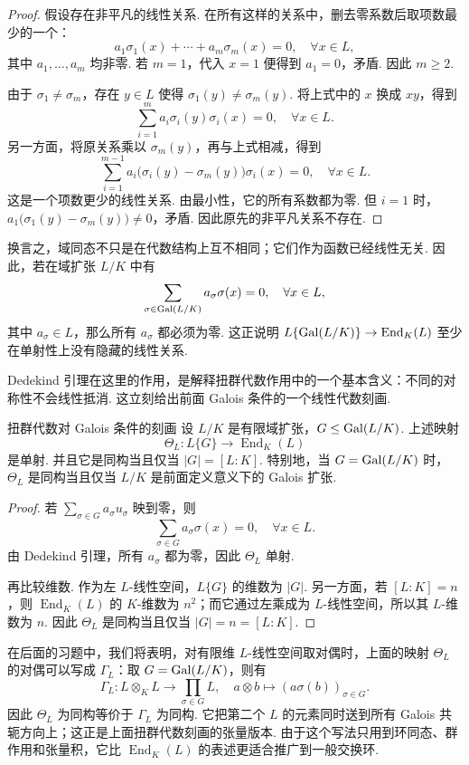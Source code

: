 \begin{proof}
    假设存在非平凡的线性关系. 在所有这样的关系中，删去零系数后取项数最少的一个：
    \[
        a_1\sigma_1(x)+\cdots+a_m\sigma_m(x)=0,\quad \forall x\in L,
    \]
    其中 $a_1,\ldots,a_m$ 均非零. 若 $m=1$，代入 $x=1$ 便得到 $a_1=0$，矛盾. 因此 $m\geq2$.

    由于 $\sigma_1\neq\sigma_m$，存在 $y\in L$ 使得 $\sigma_1(y)\neq\sigma_m(y)$. 将上式中的 $x$ 换成 $xy$，得到
    \[
        \sum_{i=1}^m a_i\sigma_i(y)\sigma_i(x)=0,\quad \forall x\in L.
    \]
    另一方面，将原关系乘以 $\sigma_m(y)$，再与上式相减，得到
    \[
        \sum_{i=1}^{m-1} a_i\bigl(\sigma_i(y)-\sigma_m(y)\bigr)\sigma_i(x)=0,\quad \forall x\in L.
    \]
    这是一个项数更少的线性关系. 由最小性，它的所有系数都为零. 但 $i=1$ 时，$a_1\bigl(\sigma_1(y)-\sigma_m(y)\bigr)\neq0$，矛盾. 因此原先的非平凡关系不存在.
\end{proof}

换言之，域同态不只是在代数结构上互不相同；它们作为函数已经线性无关. 因此，若在域扩张 $L/K$ 中有
\[
    \sum_{\sigma\in\operatorname{Gal}(L/K)}a_\sigma\sigma(x)=0,\quad \forall x\in L,
\]
其中 $a_\sigma\in L$，那么所有 $a_\sigma$ 都必须为零. 这正说明 $L\{\operatorname{Gal}(L/K)\}\to \operatorname{End}_K(L)$ 至少在单射性上没有隐藏的线性关系.

Dedekind 引理在这里的作用，是解释扭群代数作用中的一个基本含义：不同的对称性不会线性抵消. 这立刻给出前面 Galois 条件的一个线性代数刻画.

\begin{theorem}{扭群代数对 Galois 条件的刻画}{}
    设 $L/K$ 是有限域扩张，$G\leq\operatorname{Gal}(L/K)$. 上述映射
    \[
        \Theta_L\colon L\{G\}\to \operatorname{End}_K(L)
    \]
    是单射. 并且它是同构当且仅当 $|G|=[L:K]$. 特别地，当 $G=\operatorname{Gal}(L/K)$ 时，$\Theta_L$ 是同构当且仅当 $L/K$ 是前面定义意义下的 Galois 扩张.
\end{theorem}

\begin{proof}
    若 $\sum_{\sigma\in G}a_\sigma u_\sigma$ 映到零，则
    \[
        \sum_{\sigma\in G}a_\sigma\sigma(x)=0,\quad \forall x\in L.
    \]
    由 Dedekind 引理，所有 $a_\sigma$ 都为零，因此 $\Theta_L$ 单射.

    再比较维数. 作为左 $L$-线性空间，$L\{G\}$ 的维数为 $|G|$. 另一方面，若 $[L:K]=n$，则 $\operatorname{End}_K(L)$ 的 $K$-维数为 $n^2$；而它通过左乘成为 $L$-线性空间，所以其 $L$-维数为 $n$. 因此 $\Theta_L$ 是同构当且仅当 $|G|=n=[L:K]$.
\end{proof}

在后面的习题中，我们将表明，对有限维 $L$-线性空间取对偶时，上面的映射 $\Theta_L$ 的对偶可以写成 $\Gamma_L$：取 $G=\operatorname{Gal}(L/K)$，则有
\[
    \Gamma_L\colon L\otimes_K L\to \prod_{\sigma\in G}L,\quad
    a\otimes b\mapsto \left(a\sigma(b)\right)_{\sigma\in G}.
\]
因此 $\Theta_L$ 为同构等价于 $\Gamma_L$ 为同构. 它把第二个 $L$ 的元素同时送到所有 Galois 共轭方向上；这正是上面扭群代数刻画的张量版本. 由于这个写法只用到环同态、群作用和张量积，它比 $\operatorname{End}_K(L)$ 的表述更适合推广到一般交换环.

